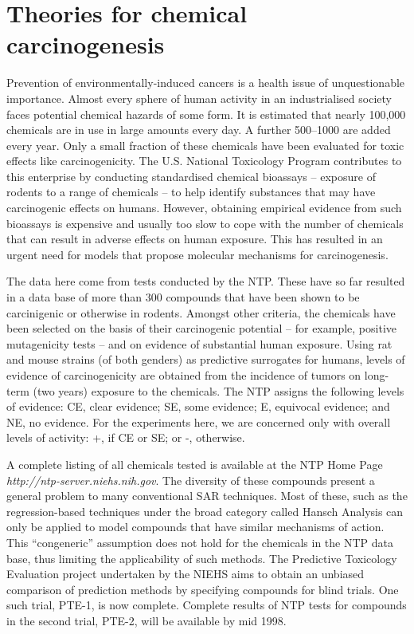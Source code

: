


\section*{Theories for chemical carcinogenesis}
Prevention of environmentally-induced cancers is a health issue of
unquestionable importance.  Almost every sphere of human activity in
an industrialised society faces potential chemical hazards of some
form.  It is estimated that nearly 100,000
chemicals are in use in large amounts every day. A further 500--1000
are added every year.  Only a small fraction of these chemicals have
been evaluated for toxic effects like carcinogenicity. The U.S.
National Toxicology Program  contributes to this enterprise
by conducting standardised chemical bioassays -- exposure of rodents
to a range of chemicals -- to help identify substances that may have
carcinogenic effects on humans.  However, obtaining empirical evidence
from such bioassays is expensive and usually too slow to cope with the
number of chemicals that can result in adverse effects on human
exposure.  This has resulted in an urgent need for models that propose
molecular mechanisms for carcinogenesis.

The data here come from tests conducted by the NTP.
These have  so far resulted in a data base of more
than 300 compounds that have been shown to be carcinigenic or otherwise
in rodents. Amongst other criteria, the chemicals have been selected
on the basis of their carcinogenic potential
-- for example, positive mutagenicity tests -- and on
evidence of substantial human exposure.
Using rat and mouse strains (of both genders) as predictive surrogates
for humans, levels of evidence of carcinogenicity are obtained from
the incidence of tumors on long-term (two years) exposure to the chemicals.
The NTP assigns the following levels of evidence: CE, clear evidence;
SE, some evidence; E, equivocal evidence; and NE, no evidence.
For the experiments here, we are concerned only with overall
levels of activity: +, if CE or SE; or -, otherwise.

A complete listing of all chemicals tested
is available at the NTP Home Page {\em http://ntp-server.niehs.nih.gov\/}.
The diversity of these compounds present a general problem to many
conventional SAR techniques. Most of these, such as the regression-based
techniques under the broad category called Hansch Analysis
can only be applied to model compounds that have similar
mechanisms of action. This ``congeneric'' assumption does not hold for the
chemicals in the NTP data base, thus limiting the applicability of such
methods. The Predictive Toxicology Evaluation project undertaken by
the NIEHS aims to obtain an unbiased comparison of prediction methods
by specifying compounds for blind trials. One such trial, PTE-1, is now
complete. Complete results of NTP tests for compounds in the second trial, PTE-2,
will be available by mid 1998.

